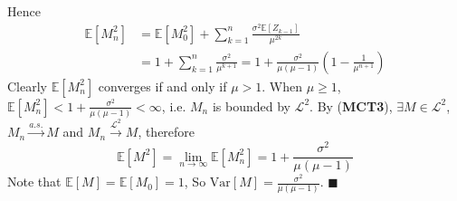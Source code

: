 \documentclass[a4paper,12pt,twoside]{book}
\begin{document}
\begin{itemize}
\begin{itemize}
\begin{equation}
	\end{equation}
	Hence
	\begin{equation}
		\begin{split}
			\mathbb{E}\left[M_n^2\right]&=\mathbb{E}\left[M_0^2\right]+\sum_{k=1}^n \frac{\sigma^2 \mathbb{E}\left[Z_{k-1}\right]}{\mu^{2k}}\\&=1+\sum_{k=1}^n \frac{\sigma^2}{\mu^{k+1}}=1+\frac{\sigma^2}{\mu(\mu-1)}\left(1-\frac{1}{\mu^{n+1}}\right)
		\end{split}
	\end{equation}
	Clearly $\mathbb{E}\left[M_n^2\right]$ converges if and only if $\mu>1$. \newline
	When $\mu\geq 1$, $\mathbb{E}\left[M_n^2\right]<1+\frac{\sigma^2}{\mu(\mu-1)}<\infty$, i.e. $M_n$ is bounded by $\mathcal{L}^2$. By (\textbf{MCT3}), $\exists M\in \mathcal{L}^2$, $M_n \xrightarrow{a.s.} M$ and $M_n \xrightarrow{\mathcal{L}^2} M$, therefore
	\begin{equation}
		\mathbb{E}\left[M^2\right]=\lim\limits_{n\rightarrow\infty}\mathbb{E}\left[M_n^2\right]=1+\frac{\sigma^2}{\mu(\mu-1)}
	\end{equation}
	Note that $\mathbb{E}\left[M\right]=\mathbb{E}\left[M_0\right]=1$, So $\mathrm{Var}\left[M\right]=\frac{\sigma^2}{\mu(\mu-1)}$. $\blacksquare$
\end{itemize}


\end{itemize}
\end{document}
